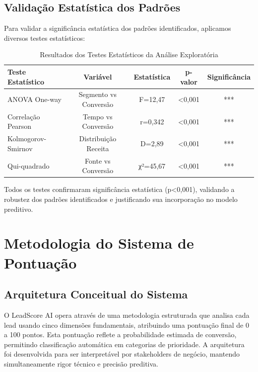 \documentclass[portuguese,11pt]{article}
\begin{document}
\subsection{Validação Estatística dos Padrões}
Para validar a significância estatística dos padrões identificados, aplicamos diversos testes estatísticos:

\begin{table}[H]
\centering
\begin{tabular}{lcccc}
\toprule
\textbf{Teste Estatístico} & \textbf{Variável} & \textbf{Estatística} & \textbf{p-valor} & \textbf{Significância} \\
\midrule
ANOVA One-way & Segmento vs Conversão & F=12,47 & <0,001 & *** \\
Correlação Pearson & Tempo vs Conversão & r=0,342 & <0,001 & *** \\
Kolmogorov-Smirnov & Distribuição Receita & D=2,89 & <0,001 & *** \\
Qui-quadrado & Fonte vs Conversão & χ²=45,67 & <0,001 & *** \\
\bottomrule
\end{tabular}
\caption{Resultados dos Testes Estatísticos da Análise Exploratória}
\end{table}

Todos os testes confirmaram significância estatística (p<0,001), validando a robustez dos padrões identificados e justificando sua incorporação no modelo preditivo.

\section{Metodologia do Sistema de Pontuação}

\subsection{Arquitetura Conceitual do Sistema}
O LeadScore AI opera através de uma metodologia estruturada que analisa cada lead usando cinco dimensões fundamentais, atribuindo uma pontuação final de 0 a 100 pontos. Esta pontuação reflete a probabilidade estimada de conversão, permitindo classificação automática em categorias de prioridade. A arquitetura foi desenvolvida para ser interpretável por stakeholders de negócio, mantendo simultaneamente rigor técnico e precisão preditiva.
\end{document}
